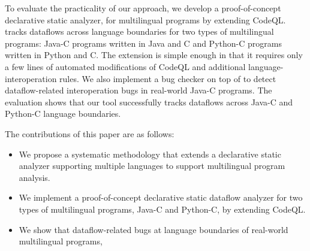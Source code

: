 To evaluate the practicality of our approach, we develop a proof-of-concept
declarative static analyzer, \inred{\ours,} for multilingual programs by extending CodeQL. \inred{\ours}
tracks dataflows across language boundaries for two types of
multilingual programs: Java-C programs written in Java and C and Python-C
programs written in Python and C. The extension is simple enough in that
it requires only a few lines of automated modifications of CodeQL and additional
language-interoperation rules. We also implement a bug checker on top of
\ours to detect dataflow-related interoperation bugs in real-world Java-C programs.
The evaluation shows that our tool successfully tracks dataflows across
Java-C and Python-C language boundaries. 

The contributions of this paper are as follows:
\begin{itemize}
\item We propose a systematic methodology that extends a declarative static analyzer
supporting multiple languages to support multilingual program analysis.

\item We implement a proof-of-concept declarative static dataflow analyzer\inred{, \ours,} for two
types of multilingual programs, Java-C and Python-C, by extending CodeQL.

\item We show that 
dataflow-related bugs at language boundaries of real-world multilingual
programs, 

\end{itemize}

